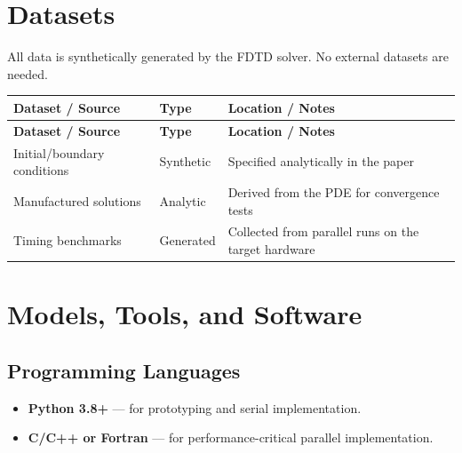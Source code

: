 \documentclass[11pt,a4paper]{article}
\begin{document}
\section{Datasets}
All data is synthetically generated by the FDTD solver. No external datasets are needed.

\begin{longtable}{p{4.5cm} p{3.5cm} p{6cm}}
\toprule
\textbf{Dataset / Source} & \textbf{Type} & \textbf{Location / Notes} \\
\midrule
\endfirsthead
\toprule
\textbf{Dataset / Source} & \textbf{Type} & \textbf{Location / Notes} \\
\midrule
\endhead
Initial/boundary conditions & Synthetic & Specified analytically in the paper \\
\midrule
Manufactured solutions & Analytic & Derived from the PDE for convergence tests \\
\midrule
Timing benchmarks & Generated & Collected from parallel runs on the target hardware \\
\bottomrule
\end{longtable}

\section{Models, Tools, and Software}

\subsection{Programming Languages}
\begin{itemize}
  \item \textbf{Python 3.8+} --- for prototyping and serial implementation.
  \item \textbf{C/C++ or Fortran} --- for performance-critical parallel implementation.
\end{itemize}
\end{document}
